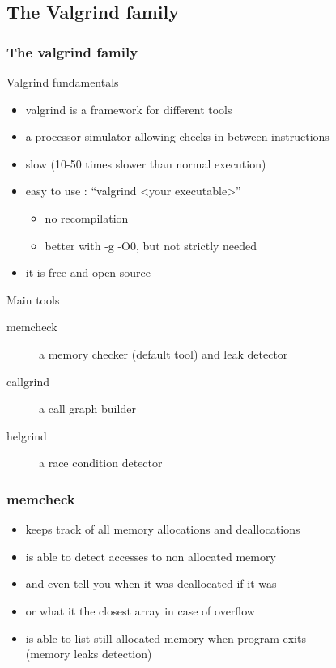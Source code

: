 \subsection[valgrind]{The Valgrind family}

\begin{frame}[fragile]
  \frametitle{The valgrind family}
  \begin{block}{Valgrind fundamentals}
    \begin{itemize}
    \item valgrind is a framework for different tools
    \item a processor simulator allowing checks in between instructions
    \item slow (10-50 times slower than normal execution)
    \item easy to use : ``valgrind \textless{}your executable\textgreater''
      \begin{itemize}
      \item no recompilation
      \item better with -g -O0, but not strictly needed
      \end{itemize}
    \item it is free and open source
    \end{itemize}
  \end{block}
  \pause
  \begin{block}{Main tools}
    \begin{description}
      \item[memcheck] a memory checker (default tool) and leak detector
      \item[callgrind] a call graph builder
      \item[helgrind] a race condition detector
    \end{description}
  \end{block}
\end{frame}

\begin{frame}[fragile]
  \frametitle{memcheck}
  \begin{block}{}
    \begin{itemize}
      \item keeps track of all memory allocations and deallocations
      \item is able to detect accesses to non allocated memory
      \item and even tell you when it was deallocated if it was
      \item or what it the closest array in case of overflow
      \item is able to list still allocated memory when program exits\\
        (memory leaks detection)
    \end{itemize}
  \end{block}
\end{frame}

